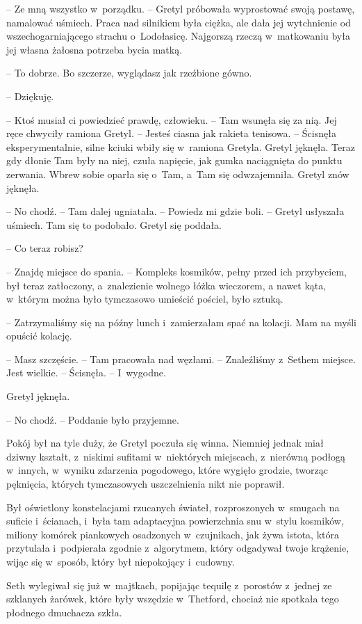 \documentclass[oneside,polish,11pt,sfheadings]{mwbk}
\begin{document}
-- Ze mną wszystko w~porządku. -- Gretyl próbowała wyprostować swoją
postawę, namalować uśmiech. Praca nad silnikiem była ciężka, ale dała
jej wytchnienie od wszechogarniającego strachu o~Lodołasicę. Najgorszą
rzeczą w~matkowaniu była jej własna żałosna potrzeba bycia matką.

-- To dobrze. Bo szczerze, wyglądasz jak rzeźbione gówno.

-- Dziękuję.

-- Ktoś musiał ci powiedzieć prawdę, człowieku. -- Tam wsunęła się za nią.
Jej ręce chwyciły ramiona Gretyl. -- Jesteś ciasna jak rakieta tenisowa.
-- Ścisnęła eksperymentalnie, silne kciuki wbiły się w~ramiona Gretyla.
Gretyl jęknęła. Teraz gdy dłonie Tam były na niej, czuła napięcie, jak
gumka naciągnięta do punktu zerwania. Wbrew sobie oparła się o~Tam, a~Tam się odwzajemniła. Gretyl znów jęknęła.

-- No chodź. -- Tam dalej ugniatała. -- Powiedz mi gdzie boli. -- Gretyl
usłyszała uśmiech. Tam się to podobało. Gretyl się poddała. 

-- Co teraz robisz?

-- Znajdę miejsce do spania. -- Kompleks kosmików, pełny przed ich
przybyciem, był teraz zatłoczony, a~znalezienie wolnego łóżka wieczorem,
a nawet kąta, w~którym można było tymczasowo umieścić pościel, było
sztuką. 

-- Zatrzymaliśmy się na późny lunch i~zamierzałam spać na
kolacji. Mam na myśli opuścić kolację.

-- Masz szczęście. -- Tam pracowała nad węzłami. -- Znaleźliśmy z~Sethem
miejsce. Jest wielkie. -- Ścisnęła. -- I~wygodne.

Gretyl jęknęła. 

-- No chodź. -- Poddanie było przyjemne.

Pokój był na tyle duży, że Gretyl poczuła się winna. Niemniej jednak
miał dziwny kształt, z~niskimi sufitami w~niektórych miejscach, z~nierówną podłogą w~innych, w~wyniku zdarzenia pogodowego, które wygięło
grodzie, tworząc pęknięcia, których tymczasowych uszczelnienia nikt nie
poprawił.

Był oświetlony konstelacjami rzucanych świateł, rozproszonych w~smugach
na suficie i~ścianach, i~była tam adaptacyjna powierzchnia snu w~stylu
kosmików, miliony komórek piankowych osadzonych w~czujnikach, jak żywa
istota, która przytulała i~podpierała zgodnie z~algorytmem, który
odgadywał twoje krążenie, wijąc się w~sposób, który był niepokojący i~cudowny.

Seth wylegiwał się już w~majtkach, popijając tequilę z~porostów z~jednej
ze szklanych żarówek, które były wszędzie w~Thetford, chociaż nie
spotkała tego płodnego dmuchacza szkła.
\end{document}
